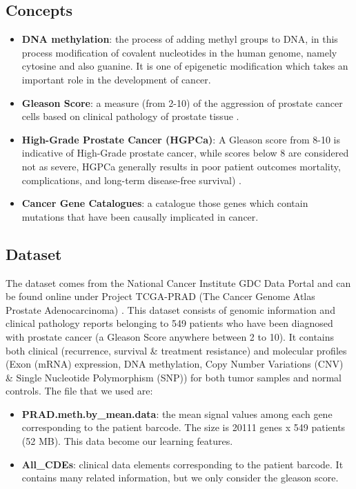 \documentclass[a4paper,oneside]{article}
\begin{document}
\subsection{Concepts}
\begin{itemize}
\item \textbf{DNA methylation}: the process of adding methyl groups to DNA, in this process modification of covalent nucleotides in the human genome, namely cytosine and also guanine. It is one of epigenetic modification which takes an important role in the development of cancer.
\item \textbf{Gleason Score}: a measure (from 2-10) of the aggression of prostate cancer cells based on clinical pathology of prostate tissue \cite{prostate}.
\item \textbf{High-Grade Prostate Cancer (HGPCa)}: A Gleason score from 8-10 is indicative of High-Grade prostate cancer, while scores below 8 are considered not as severe, HGPCa generally results in poor patient outcomes mortality, complications, and long-term disease-free survival) \cite{prostate}.
\item \textbf{Cancer Gene Catalogues}: a catalogue those genes which contain mutations that have been causally implicated in cancer.
\end{itemize}

\subsection{Dataset}
The dataset comes from the National Cancer Institute GDC Data Portal and can be found online under Project TCGA-PRAD (The Cancer Genome Atlas Prostate Adenocarcinoma) \cite{praddata}. This dataset consists of genomic information and clinical pathology reports belonging to 549 patients who have been diagnosed with prostate cancer (a Gleason Score anywhere between 2 to 10). It contains both clinical (recurrence, survival \& treatment resistance) and molecular profiles (Exon (mRNA) expression, DNA methylation, Copy Number Variations (CNV) \& Single Nucleotide Polymorphism (SNP)) for both tumor samples and normal controls. The file that we used are:
\begin{itemize}
\item \textbf{PRAD.meth.by\_mean.data}: the mean signal values among each gene corresponding to the patient barcode. The size is 20111 genes x 549 patients (52 MB). This data become our learning features.
\item \textbf{All\_CDEs}: clinical data elements corresponding to the patient barcode. It contains many related information, but we only consider the gleason score.
\end{itemize}
\end{document}
